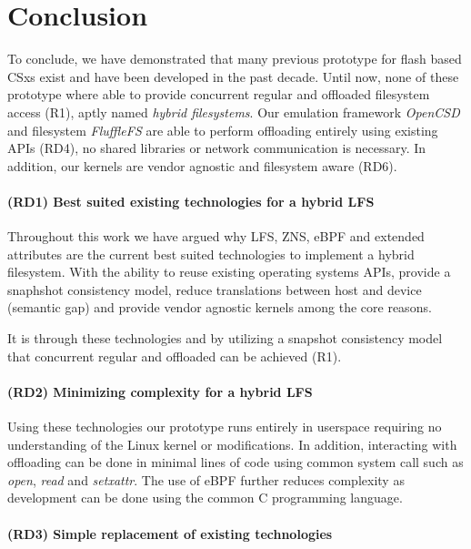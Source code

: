 \chapter{Conclusion}

To conclude, we have demonstrated that many previous prototype for flash based
CSxs exist and have been developed in the past decade. Until now, none of
these prototype where able to provide concurrent regular and offloaded
filesystem access (R1), aptly named \textit{hybrid filesystems}. Our emulation
framework \textit{OpenCSD} and filesystem \textit{FluffleFS} are able to perform
offloading entirely using existing APIs (RD4), no shared libraries or network
communication is necessary. In addition, our kernels are vendor agnostic and
filesystem aware (RD6).

\subsubsection*{(RD1) Best suited existing technologies for a hybrid LFS}

Throughout this work we have argued why LFS, ZNS, eBPF and extended attributes
are the current best suited technologies to implement a hybrid filesystem.
With the ability to reuse existing operating systems APIs, provide
a snaphshot consistency model, reduce translations between host and device
(semantic gap) and provide vendor agnostic kernels among the core reasons.

It is through these technologies and by utilizing a snapshot
consistency model that concurrent regular and offloaded can be achieved (R1).

\subsubsection*{(RD2) Minimizing complexity for a hybrid LFS}

Using these technologies our prototype runs entirely in userspace requiring no
understanding of the Linux kernel or modifications. In addition, interacting
with offloading can be done in minimal lines of code using common system call
such as \textit{open}, \textit{read} and \textit{setxattr}. The use of eBPF
further reduces complexity as development can be done using the common C
programming language.

\subsubsection*{(RD3) Simple replacement of existing technologies}

